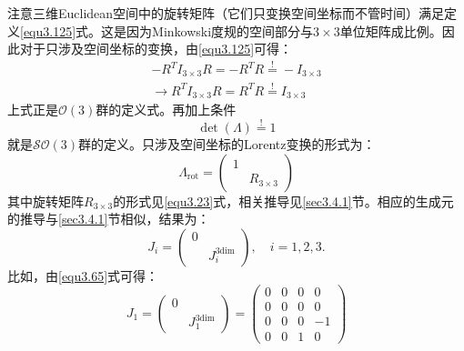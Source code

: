 注意三维Euclidean空间中的旋转矩阵（它们只变换空间坐标而不管时间）满足定义\ref{equ3.125}式。这是因为Minkowski度规的空间部分与$3 \times 3$单位矩阵成比例。因此对于只涉及空间坐标的变换，由\ref{equ3.125}可得：
\begin{align*}
	-R^T I_{3 \times 3} R = - R^T R \stackrel{!}{=} -I_{3 \times 3} \\
	\rightarrow R^T I_{3 \times 3} R = R^T R \stackrel{!}{=} I_{3 \times 3}
\end{align*}
上式正是$\mathcal{O}(3)$群的定义式。再加上条件
\begin{equation*}
	\det(\Lambda) \stackrel{!}{=} 1
\end{equation*}
就是$\mathcal{SO}(3)$群的定义。只涉及空间坐标的Lorentz变换的形式为：
\begin{equation*}
	\Lambda_{\mathrm{rot}} =
		\begin{pmatrix}
			1 & \\
			  & R_{3 \times 3}
		\end{pmatrix}
\end{equation*}
其中旋转矩阵$R_{3 \times 3}$的形式见\ref{equ3.23}式，相关推导见\ref{sec3.4.1}节。相应的生成元的推导与\ref{sec3.4.1}节相似，结果为：
\begin{equation}
	\label{equ3.135}
	J_i =
		\begin{pmatrix}
			0 & \\
			  & J_i^{3\mathrm{dim}}
		\end{pmatrix}
	,\quad
	i = 1, 2, 3.
\end{equation}
比如，由\ref{equ3.65}式可得：
\begin{equation}
	\label{equ3.136}
	J_1 =
		\begin{pmatrix}
			0 & \\
			  & J_1^{3 \mathrm{dim}}
		\end{pmatrix}
	=
		\begin{pmatrix}
			0 & 0 & 0 & 0 \\
			0 & 0 & 0 & 0 \\
			0 & 0 & 0 & -1 \\
			0 & 0 & 1 & 0
		\end{pmatrix}
\end{equation}

